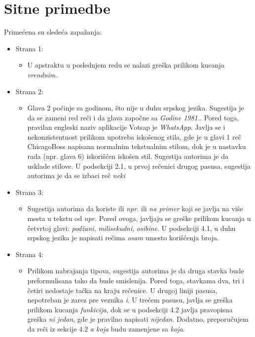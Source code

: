 \documentclass[a4paper]{report}
\begin{document}
\section{Sitne primedbe}
Primećena su sledeća zapažanja:
\begin{itemize}
    \item Strana 1:
    \begin{itemize}
        \item U apstraktu u poslednjem redu se nalazi greška prilikom kucanja \textit{vrendnim}.
    \end{itemize}
    \item Strana 2:
    \begin{itemize}
        \item Glava 2 počinje sa godinom, što nije u duhu srpskog jezika. Sugestija je da se zameni red reči i da glava započne sa \textit{Godine 1981.}. Pored toga, pravilan engleski naziv aplikacije Votsap je \textit{WhatsApp}. Javlja se i nekonzistentnost prilikom upotreba iskošenog stila, gde je u glavi 1 reč ChicagoBoss napisana normalnim tekstualnim stilom, dok je u nastavku rada (npr. glava 6) iskorišćen iskošen stil. Sugestija autorima je da usklade stilove.
        U podsekciji 2.1, u prvoj rečenici drugog pasusa, sugestija autorima je da se izbaci reč \textit{neki}
    \end{itemize}
    \item Strana 3:
    \begin{itemize}
        \item Sugestija autorima da koriste ili \textit{npr.} ili \textit{na primer} koji se javlja na više mesta u tekstu od \textit{npr.} Pored ovoga, javljaju se greške prilikom kucanja u četvrtoj glavi: \textit{podžani}, \textit{milisekudni}, \textit{osibine}. U podsekciji 4.1, u duhu srpskog jezika je napisati rečima \textit{osam} umesto korišćenja broja.
    \end{itemize}
    \item Strana 4:
    \begin{itemize}
        \item Prilikom nabrajanja tipova, sugestija autorima je da druga stavka bude preformulisana tako da bude smislenija. Pored toga, stavkama dva, tri i četiri nedostaje tačka na kraju rečenice. U drugoj liniji pasusa, nepotreban je zarez pre veznika \textit{i}. U trećem pasusu, javlja se greška prilikom kucanja \textit{funkicija}, dok se u podsekciji 4.2 javlja pravopisna greška \textit{ni jedan}, gde je pravilno napisati \textit{nijedan}. Dodatno, preporučujem da reči iz sekcije 4.2 \textit{a koja} budu zamenjene sa \textit{koja}.\\


\end{itemize}
\end{itemize}
\end{document}
